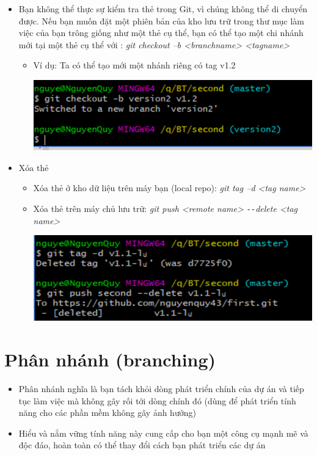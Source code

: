 \documentclass[12pt,a4paper]{report}
\begin{document}
\begin{itemize}
\item Bạn không thể thực sự kiểm tra thẻ trong Git, vì chúng không thể di chuyển được. Nếu bạn muốn đặt một phiên bản của kho lưu trữ trong thư mục làm việc của bạn trông giống như một thẻ cụ thể, bạn có thể tạo một chi nhánh mới tại một thẻ cụ thể với : {\it git checkout –b <branchname> <tagname>}
\begin{itemize}
 \item Ví dụ: Ta có thể tạo mới một nhánh riêng có tag v1.2

	\includegraphics[width=0.8\linewidth]{screenshot046}

	\label{fig:screenshot046}

\end{itemize}
\item Xóa thẻ
\begin{itemize}
\item Xóa thẻ ở kho dữ liệu trên máy bạn (local repo): {\it  git tag –d <tag name>}
\item Xóa thẻ trên máy chủ lưu trữ: {\it git push <remote name> \texttt{-{}-}delete <tag name>}

	\includegraphics[width=0.8\linewidth]{screenshot047}
	
	\label{fig:screenshot047}
\end{itemize}\end{itemize}
			
\section{Phân nhánh (branching)}
\begin{itemize}
\item Phân nhánh nghĩa là bạn tách khỏi dòng phát triển chính của dự án và tiếp tục làm việc mà không gây rối tới dòng chính đó (dùng để phát triển tính năng cho các phần mềm không gây ảnh hưởng)\vskip 0.4cm
\item Hiểu và nắm vững tính năng này cung cấp cho bạn một công cụ mạnh mẽ và độc đáo, hoàn toàn có thể thay đổi cách bạn phát triển các dự án
\end{itemize}
\end{document}
